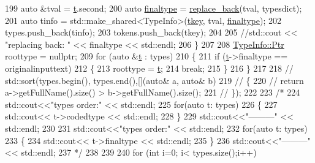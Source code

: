 \begin{DoxyCode}
199         \textcolor{keyword}{auto} &tval = \hyperlink{namespacebattery__monitor__node_a7a63d20d1ea461e280f4eb5b47f925cd}{t}.second;
200         \textcolor{keyword}{auto} \hyperlink{classsmacc_1_1introspection_1_1TypeInfo_aa4010ed427e12db443e08ab16a3de243}{finaltype} = \hyperlink{namespacesmacc_1_1introspection_a19350163cda321a04645dcd6f6585f24}{replace\_back}(tval, typesdict);
201         \textcolor{keyword}{auto} tinfo = std::make\_shared<TypeInfo>(\hyperlink{classsmacc_1_1introspection_1_1TypeInfo_a697dd505119258dba1224d10eea5b2bd}{tkey}, tval, \hyperlink{classsmacc_1_1introspection_1_1TypeInfo_aa4010ed427e12db443e08ab16a3de243}{finaltype});
202         types.push\_back(tinfo);
203         tokens.push\_back(tkey);
204 
205         \textcolor{comment}{//std::cout << "replacing back: " << finaltype << std::endl;}
206     \}
207 
208     \hyperlink{classsmacc_1_1introspection_1_1TypeInfo_aa6ffd9c39811d59f7c771941b7fad860}{TypeInfo::Ptr} roottype = \textcolor{keyword}{nullptr};
209     \textcolor{keywordflow}{for} (\textcolor{keyword}{auto} &\hyperlink{namespacebattery__monitor__node_a7a63d20d1ea461e280f4eb5b47f925cd}{t} : types)
210     \{
211         \textcolor{keywordflow}{if} (\hyperlink{namespacebattery__monitor__node_a7a63d20d1ea461e280f4eb5b47f925cd}{t}->finaltype == originalinputtext)
212         \{
213             roottype = \hyperlink{namespacebattery__monitor__node_a7a63d20d1ea461e280f4eb5b47f925cd}{t};
214             \textcolor{keywordflow}{break};
215         \}
216     \}
217 
218     \textcolor{comment}{// std::sort(types.begin(), types.end(),[](auto& a, auto& b)}
219     \textcolor{comment}{// \{}
220     \textcolor{comment}{//     return a->getFullName().size() > b->getFullName().size();}
221     \textcolor{comment}{// \});}
222 
223     \textcolor{comment}{/*}
224 \textcolor{comment}{    std::cout<<"types order:" << std::endl;}
225 \textcolor{comment}{    for(auto t: types)}
226 \textcolor{comment}{    \{}
227 \textcolor{comment}{        std::cout<< t->codedtype << std::endl;}
228 \textcolor{comment}{    \}}
229 \textcolor{comment}{    std::cout<<"---------" << std::endl;}
230 \textcolor{comment}{}
231 \textcolor{comment}{    std::cout<<"types order:" << std::endl;}
232 \textcolor{comment}{    for(auto t: types)}
233 \textcolor{comment}{    \{}
234 \textcolor{comment}{        std::cout<< t->finaltype << std::endl;}
235 \textcolor{comment}{    \}}
236 \textcolor{comment}{    std::cout<<"---------" << std::endl;}
237 \textcolor{comment}{    */}
238 
239     
240     \textcolor{keywordflow}{for} (\textcolor{keywordtype}{int} i=0; i< types.size();i++)

\end{DoxyCode}
